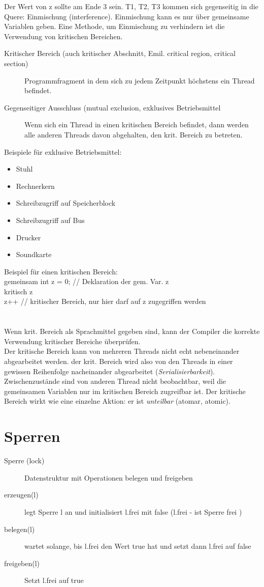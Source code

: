 Der Wert von z sollte am Ende 3 sein. T1, T2, T3 kommen sich gegenseitig in die Quere: Einmischung (interference). Einmischung kann es nur über gemeinsame Variablen geben.
Eine Methode, um Einmischung zu verhindern ist die Verwendung von kritischen Bereichen.

\begin{description}
\item[Kritischer Bereich (auch kritischer Abschnitt, Emil. critical region, critical section)] Programmfragment in dem sich zu jedem Zeitpunkt höchstens ein Thread befindet.
\item[Gegenseitiger Ausschluss (mutual exclusion, exklusives Betriebsmittel]
Wenn sich ein Thread in einen kritischen Bereich befindet, dann werden alle anderen Threads davon abgehalten, den krit. Bereich zu betreten.
\end{description}

Beispiele für exklusive Betriebsmittel:
\begin{itemize}
\item Stuhl
\item Rechnerkern
\item Schreibzugriff auf Speicherblock
\item Schreibzugriff auf Bus
\item Drucker
\item Soundkarte
\end{itemize}

Beispiel für einen kritischen Bereich:\\
gemeinsam int z = 0; 	// Deklaration der gem. Var. z\\
kritisch z {\\
	z++			// kritischer Bereich, nur hier darf auf z zugegriffen werden\\
}\\
\\
Wenn krit. Bereich als Sprachmittel gegeben sind, kann der Compiler die korrekte Verwendung kritischer Bereiche überprüfen.\\
Der kritische Bereich kann von mehreren Threads nicht echt nebeneinander abgearbeitet werden. der krit. Bereich wird also von den Threads in einer gewissen Reihenfolge nacheinander abgearbeitet (\emph{Serialisierbarkeit}). Zwischenzustände sind von anderen Thread nicht beobachtbar, weil die gemeinsamen Variablen nur im kritischen Bereich zugreifbar ist. Der kritische Bereich wirkt wie eine einzelne Aktion: er ist \emph{unteilbar} (atomar, atomic).

\section{Sperren}
\begin{description}
\item[Sperre (lock)] Datenstruktur mit Operationen belegen und freigeben
\item[erzeugen(l)] legt Sperre l an und initialisiert l.frei mit false (l.frei - ist Sperre frei )
\item[belegen(l)] wartet solange, bis l.frei den Wert true hat und setzt dann l.frei auf false
\item[freigeben(l)] Setzt l.frei auf true
\end{description}

